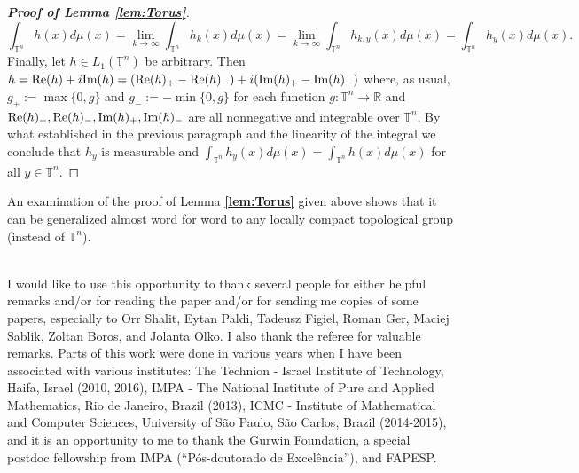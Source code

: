 \documentclass[12 pt]{amsart}
\theoremstyle{definition}
\newcommand{\R}{\mathbb{R}}
\newcommand{\T}{\mathbb{T}}
\newcommand{\re}{\textnormal{Re}}
\newcommand{\im}{\textnormal{Im}}
\newcommand{\bref}[1]{\textbf{\ref{#1}}} %
\begin{document}
\begin{proof}[{\bf Proof of Lemma \bref{lem:Torus}}]
\begin{equation*}
\int_{\T^n}h(x)d\mu(x)=\lim_{k\to\infty}\int_{\T^n}h_k(x)d\mu(x)
=\lim_{k\to\infty}\int_{\T^n}h_{k,y}(x)d\mu(x)=\int_{\T^n}h_y(x)d\mu(x).
\end{equation*}
Finally, let $h\in L_1(\T^n)$ be arbitrary. Then $h=\re(h)+i\im(h)=(\re(h)_+-\re(h)_-)+i(\im(h)_+-\im(h)_-)$ where, as usual, $g_+:=\max\{0,g\}$ and $g_-:=-\min\{0,g\}$ for each function $g:\T^n\to\R$ and $\re(h)_+,\re(h)_-,\im(h)_+,\im(h)_-$ are all nonnegative and  integrable over $\T^n$. By what established in the previous  paragraph and the linearity of the integral we conclude that $h_y$ is measurable and $\int_{\T^n}h_y(x)d\mu(x)=\int_{\T^n}h(x)d\mu(x)$ for all $y\in\T^n$. 
\end{proof}

An examination of the proof of Lemma \bref{lem:Torus} given above shows that it can be generalized almost word for word to any locally compact topological group (instead of $\T^n$). 

\vspace{0.4cm}
\vspace{0.1cm}\\
\noindent  I would like to use this opportunity to thank several people for either helpful  remarks and/or for reading the paper and/or for sending me copies of some papers, especially to Orr Shalit, Eytan Paldi, 
Tadeusz Figiel, Roman Ger, Maciej  Sablik, Zoltan Boros, and Jolanta Olko. I also thank the referee for valuable remarks. Parts of this work were done in  various years when I have been associated with various institutes: The Technion - Israel Institute of Technology, Haifa, Israel (2010, 2016),  IMPA - The National Institute of Pure and Applied Mathematics, Rio de Janeiro, Brazil (2013), ICMC - Institute of Mathematical and Computer Sciences, University of S\~ao Paulo, S\~ao Carlos, Brazil (2014-2015), and it is an opportunity to me to thank the Gurwin Foundation, a special postdoc fellowship from IMPA  (``P\'os-doutorado de Excel\^encia''), and FAPESP. 




\end{document}
